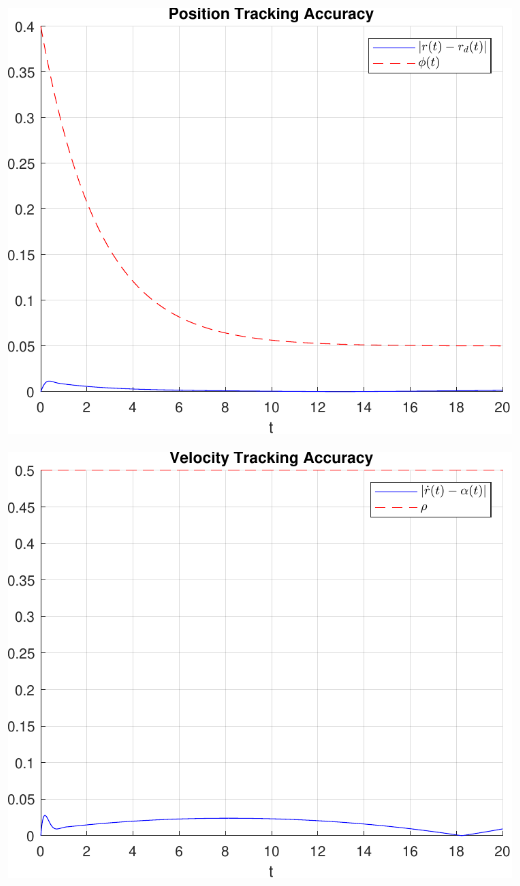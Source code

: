 \documentclass[a4paper,12pt]{article}
\begin{document}
\begin{minipage}[t]{0.45\textwidth}
    \centering
    \includegraphics[width=\linewidth]{plot/task2_position_tracking_accuracy.pdf}
    \label{fig:task2_position_tracking_accuracy}
\end{minipage}%
\hfill
\begin{minipage}[t]{0.45\textwidth}
    \centering
    \includegraphics[width=\linewidth]{plot/task2_velocity_tracking_accuracy.pdf}
    \label{fig:task2_velocity_tracking_accuracy}
\end{minipage}
\end{document}
